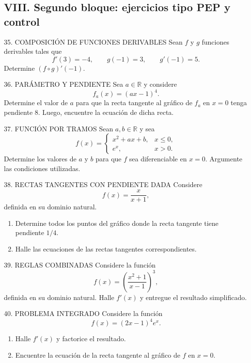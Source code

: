 \documentclass[letterpaper,12pt]{article}
\newcommand{\R}{\mathbb{R}}
\newcommand{\tituloSeccion}[1]{%
    \needspace{4\baselineskip}
    \subsection*{\color{azulFuerte}#1}
}
\begin{document}
\tituloSeccion{VIII. Segundo bloque: ejercicios tipo PEP y control}

\begin{controlbox}{35. COMPOSICIÓN DE FUNCIONES DERIVABLES}
Sean \(f\) y \(g\) funciones derivables tales que
\[
f'(3)=-4,\qquad g(-1)=3,\qquad g'(-1)=5.
\]
Determine \((f\circ g)'(-1)\).
\end{controlbox}

\begin{controlbox}{36. PARÁMETRO Y PENDIENTE}
Sea \(a\in\R\) y considere
\[
f_a(x)=(ax-1)^4.
\]
Determine el valor de \(a\) para que la recta tangente al gráfico de \(f_a\) en \(x=0\) tenga pendiente \(8\). Luego, encuentre la ecuación de dicha recta.
\end{controlbox}

\begin{controlbox}{37. FUNCIÓN POR TRAMOS}
Sean \(a,b\in\R\) y sea
\[
f(x)=
\begin{cases}
x^2+ax+b, & x\leq0,\\
e^x, & x>0.
\end{cases}
\]
Determine los valores de \(a\) y \(b\) para que \(f\) sea diferenciable en \(x=0\). Argumente las condiciones utilizadas.
\end{controlbox}

\begin{controlbox}{38. RECTAS TANGENTES CON PENDIENTE DADA}
Considere
\[
f(x)=\frac{x}{x+1},
\]
definida en su dominio natural.
\begin{enumerate}[label=\alph*),leftmargin=*]
    \item Determine todos los puntos del gráfico donde la recta tangente tiene pendiente \(1/4\).
    \item Halle las ecuaciones de las rectas tangentes correspondientes.
\end{enumerate}
\end{controlbox}

\begin{controlbox}{39. REGLAS COMBINADAS}
Considere la función
\[
f(x)=\left(\frac{x^2+1}{x-1}\right)^3,
\]
definida en su dominio natural. Halle \(f'(x)\) y entregue el resultado simplificado.
\end{controlbox}

\begin{controlbox}{40. PROBLEMA INTEGRADO}
Considere la función
\[
f(x)=(2x-1)^4e^x.
\]
\begin{enumerate}[label=\alph*),leftmargin=*]
    \item Halle \(f'(x)\) y factorice el resultado.
    \item Encuentre la ecuación de la recta tangente al gráfico de \(f\) en \(x=0\).
\end{enumerate}
\end{controlbox}
\end{document}
